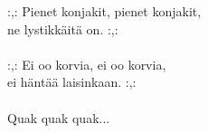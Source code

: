 
:,: Pienet konjakit, pienet konjakit, \\ ne lystikkäitä on. :,: \\ \hspace{10mm} \\ :,: Ei oo korvia, ei oo korvia, \\ ei häntää laisinkaan. :,: \\ \hspace{10mm} \\ Quak quak quak...